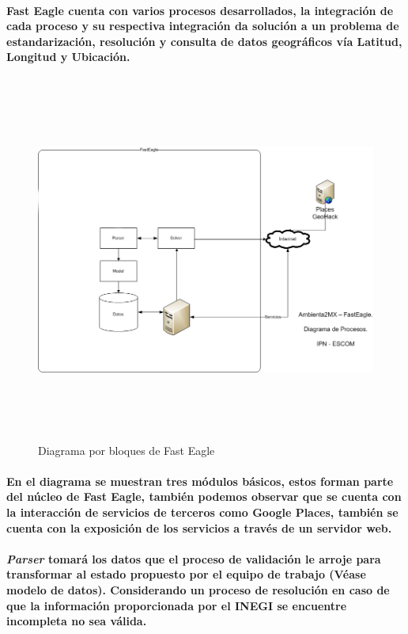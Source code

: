       \paragraph{Fast Eagle cuenta con varios procesos desarrollados, la integración de cada proceso y su respectiva integración da solución a un problema de estandarización, resolución y consulta de datos geográficos vía Latitud, Longitud y Ubicación.}
      \newpage
        \begin{landscape}
          \begin{figure}[b!]
          \centering
          \includegraphics[width=22.5cm,height=12cm]{./images/DiagramaFastEagle}
          \caption{Diagrama por bloques de Fast Eagle}
        \end{figure}
        \end{landscape}
      \newpage
      \paragraph{En el diagrama se muestran tres módulos básicos, estos forman parte del núcleo de Fast Eagle, también podemos observar que se cuenta con la interacción de servicios de terceros como Google Places,  también se cuenta con la exposición de los servicios a través de un servidor web.}
      \paragraph{\textbf{\emph{Parser}} tomará los datos que el proceso de validación le arroje para transformar al estado propuesto por el equipo de trabajo (Véase modelo de datos). Considerando un proceso de resolución en caso de que la información proporcionada por el INEGI se encuentre incompleta no sea válida.}
